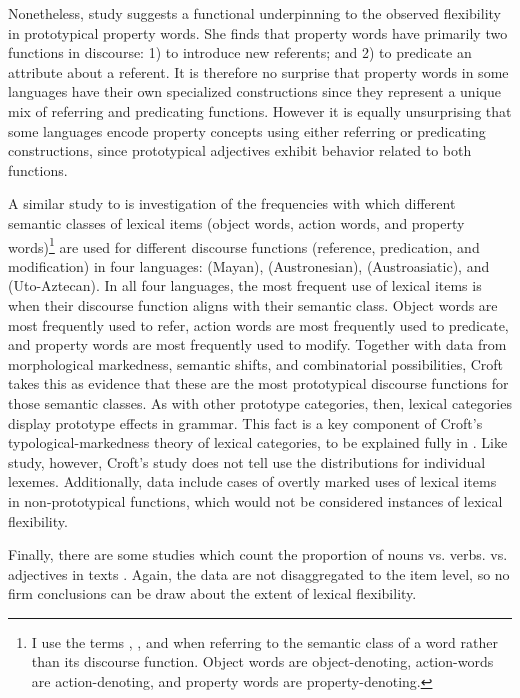 Nonetheless,  study suggests a functional underpinning to the observed flexibility in prototypical property words. She finds that property words have primarily two functions in discourse: 1) to introduce new referents; and 2) to predicate an attribute about a referent. It is therefore no surprise that property words in some languages have their own specialized constructions since they represent a unique mix of referring and predicating functions. However it is equally unsurprising that some languages encode property concepts using either referring or predicating constructions, since prototypical adjectives exhibit behavior related to both functions.

A similar study to  is  investigation of the frequencies with which different semantic classes of lexical items (object words, action words, and property words)\footnote{I use the terms , , and  when referring to the semantic class of a word rather than its discourse function. Object words are object-denoting, action-words are action-denoting, and property words are property-denoting.} are used for different discourse functions (reference, predication, and modification) in four languages:  (Mayan),  (Austronesian),  (Austroasiatic), and  (Uto-Aztecan). In all four languages, the most frequent use of lexical items is when their discourse function aligns with their semantic class. Object words are most frequently used to refer, action words are most frequently used to predicate, and property words are most frequently used to modify. Together with data from morphological markedness, semantic shifts, and combinatorial possibilities, Croft takes this as evidence that these are the most prototypical discourse functions for those semantic classes. As with other prototype categories, then, lexical categories display prototype effects in grammar. This fact is a key component of Croft's typological-markedness theory of lexical categories, to be explained fully in . Like  study, however, Croft's study does not tell use the distributions for individual lexemes. Additionally,  data include cases of overtly marked uses of lexical items in non-prototypical functions, which would not be considered instances of lexical flexibility.

Finally, there are some studies which count the proportion of nouns vs. verbs. vs. adjectives in  texts \parencites{Hudson1994}{PolinskyMagyar2020}. Again, the data are not disaggregated to the item level, so no firm conclusions can be draw about the extent of lexical flexibility.

